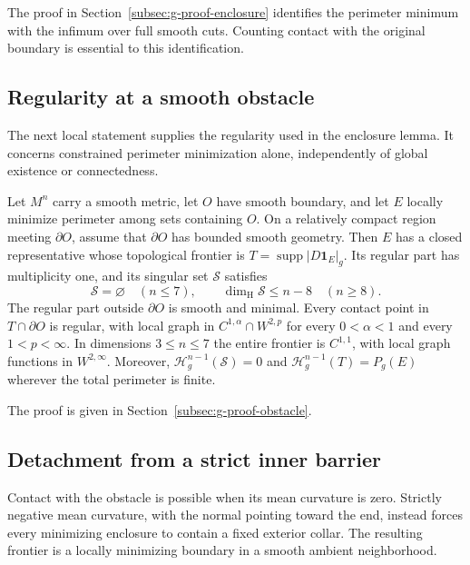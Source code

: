 The proof in Section~\ref{subsec:g-proof-enclosure} identifies the
perimeter minimum with the infimum over full smooth cuts. Counting
contact with the original boundary is essential to this identification.

\subsection{Regularity at a smooth obstacle}

The next local statement supplies the regularity used in the enclosure
lemma. It concerns constrained perimeter minimization alone, independently
of global existence or connectedness.

\begin{lemma}
\label{lem:g-obstacle}
Let $M^n$ carry a smooth metric, let $O$ have smooth boundary, and let
$E$ locally minimize perimeter among sets containing $O$.
On a relatively compact region meeting $\partial O$, assume that
$\partial O$ has bounded smooth geometry.  Then $E$ has a closed
representative whose topological frontier is
$T=\operatorname{supp}|D\mathbf1_E|_g$.
Its regular part has multiplicity one, and its singular set
$\mathcal S$ satisfies
\[
 \mathcal S=\varnothing\quad(n\le7),\qquad
 \dim_{\mathrm H}\mathcal S\le n-8\quad(n\ge8).
\]
The regular part outside $\partial O$ is smooth and minimal.  Every
contact point in $T\cap\partial O$ is regular, with local graph in
$C^{1,\alpha}\cap W^{2,p}$ for every $0<\alpha<1$ and every
$1<p<\infty$.  In dimensions $3\le n\le7$ the entire frontier is
$C^{1,1}$, with local graph functions in $W^{2,\infty}$.
Moreover, $\mathcal H^{n-1}_g(\mathcal S)=0$ and
$\mathcal H^{n-1}_g(T)=P_g(E)$ wherever the total perimeter is finite.
\end{lemma}

The proof is given in Section~\ref{subsec:g-proof-obstacle}.

\subsection{Detachment from a strict inner barrier}

Contact with the obstacle is possible when its mean curvature is zero.
Strictly negative mean curvature, with the normal pointing toward the
end, instead forces every minimizing enclosure to contain a fixed
exterior collar. The resulting frontier is a locally minimizing
boundary in a smooth ambient neighborhood.


